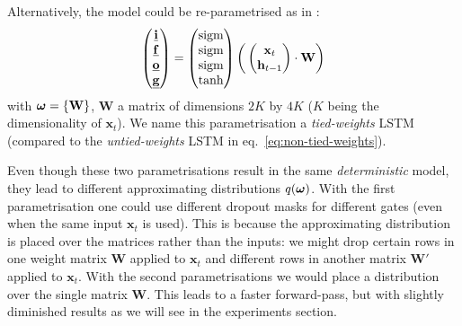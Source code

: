 \documentclass{article}
\newcommand{\f}{\mathbf{f}}
\newcommand{\x}{\mathbf{x}}
\newcommand{\W}{\mathbf{W}}
\newcommand{\bo}{\text{\boldmath$\omega$}}
\theoremstyle{definition}
\begin{document}
Alternatively, the model could be re-parametrised as in \citep{graves2013speech}:
\begin{align}\label{eq:tied-weights}
\begin{pmatrix}
\underline{\i} \\
\underline{\f} \\
\underline{\o} \\
\underline{\g}
\end{pmatrix}
=
\begin{pmatrix}
\text{sigm} \\
\text{sigm} \\
\text{sigm} \\
\text{tanh}
\end{pmatrix}
\bigg( 
\begin{pmatrix}
\x_t \\
\h_{t-1}
\end{pmatrix}
\cdot
\W
\bigg)
\end{align}
with $\bo=\{ \W \}$, $\W$ a matrix of dimensions $2K$ by $4K$ ($K$ being the dimensionality of $\x_t$). We name this parametrisation a \textit{tied-weights} LSTM (compared to the \textit{untied-weights} LSTM in eq.\ \eqref{eq:non-tied-weights}).

Even though these two parametrisations result in the same \textit{deterministic} model, they lead to different approximating distributions $q(\bo)$.
With the first parametrisation one could use different dropout masks for different gates (even when the same input $\x_t$ is used). This is because the approximating distribution is placed over the matrices rather than the inputs: we might drop certain rows in one weight matrix $\W$ applied to $\x_t$ and different rows in another matrix $\W'$ applied to $\x_t$. 
With the second parametrisations we would place a distribution over the single matrix $\W$.
This leads to a faster forward-pass, but with slightly diminished results as we will see in the experiments section.
\end{document}
